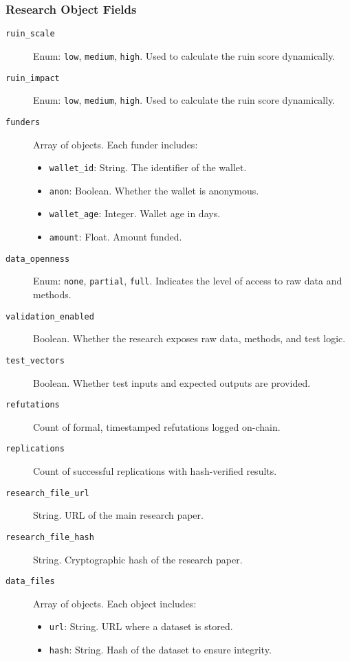 \documentclass{article}
\begin{document}
\subsubsection{Research Object Fields}
\begin{description}
	\item[\texttt{ruin\_scale}] Enum: \texttt{low}, \texttt{medium}, \texttt{high}. Used to calculate the ruin score dynamically.
	\item[\texttt{ruin\_impact}] Enum: \texttt{low}, \texttt{medium}, \texttt{high}. Used to calculate the ruin score dynamically.
	\item[\texttt{funders}] Array of objects. Each funder includes:
	\begin{itemize}
		\item \texttt{wallet\_id}: String. The identifier of the wallet.
		\item \texttt{anon}: Boolean. Whether the wallet is anonymous.
		\item \texttt{wallet\_age}: Integer. Wallet age in days.
		\item \texttt{amount}: Float. Amount funded.
	\end{itemize}
	\item[\texttt{data\_openness}] Enum: \texttt{none}, \texttt{partial}, \texttt{full}. Indicates the level of access to raw data and methods.
	\item[\texttt{validation\_enabled}] Boolean. Whether the research exposes raw data, methods, and test logic.
	\item[\texttt{test\_vectors}] Boolean. Whether test inputs and expected outputs are provided.
	\item[\texttt{refutations}] Count of formal, timestamped refutations logged on-chain.
	\item[\texttt{replications}] Count of successful replications with hash-verified results.
	\item[\texttt{research\_file\_url}] String. URL of the main research paper.
	\item[\texttt{research\_file\_hash}] String. Cryptographic hash of the research paper.
	\item[\texttt{data\_files}] Array of objects. Each object includes:
	\begin{itemize}
		\item \texttt{url}: String. URL where a dataset is stored.
		\item \texttt{hash}: String. Hash of the dataset to ensure integrity.
	\end{itemize}
\end{description}
\end{document}
